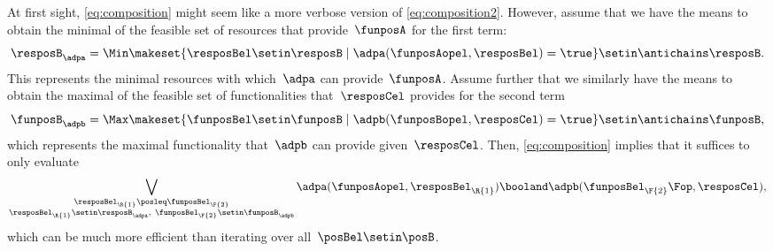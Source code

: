 At first sight, \cref{eq:composition} might seem like a more verbose version of \cref{eq:composition2}.
However, assume that we have the means to obtain the minimal  of the feasible set of resources that provide~$\funposA$ for the first term:
\begin{equation}
    \resposB_\adpa = \Min \makeset{\resposBel\setin \resposB \mid \adpa(\funposAopel,\resposBel)=\true} \setin \antichains \resposB.
\end{equation}
This represents the minimal resources with which~$\adpa$ can provide~$\funposA$.
Assume further that we similarly have the means to obtain the maximal  of the feasible set of functionalities that~$\resposCel$ provides for the second term
\begin{equation}
    \funposB_\adpb = \Max \makeset{\funposBel\setin \funposB \mid \adpb(\funposBopel,\resposCel)=\true} \setin \antichains \funposB,
\end{equation}
which represents the maximal functionality that~$\adpb$ can provide given~$\resposCel$.
Then, \cref{eq:composition} implies that it suffices to only evaluate
\begin{equation}
    \bigvee_{\substack{\resposBel_\R{1}\posleq\funposBel_\F{2} \\ \resposBel_\R{1}\setin \resposB_\adpa,~ \funposBel_\F{2}\setin\funposB_\adpb }} \adpa(\funposAopel,\resposBel_\R{1}) \booland \adpb(\funposBel_\F{2}\Fop,\resposCel),
\end{equation}
which can be much more efficient than iterating over all~$\posBel\setin \posB$.
